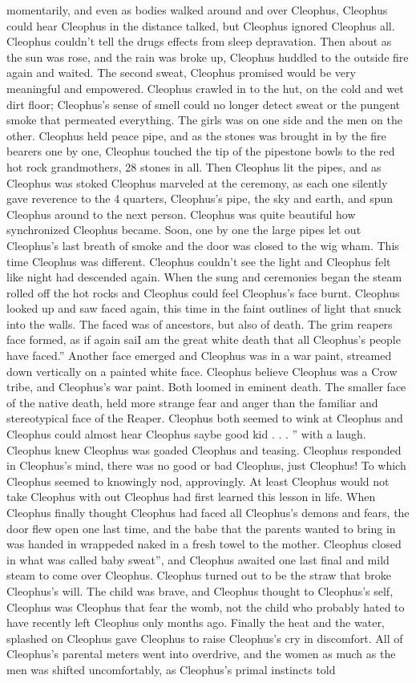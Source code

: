 \documentclass[12pt]{book}
\begin{document}
momentarily, and even as bodies walked around and over Cleophus, Cleophus could hear Cleophus in the distance talked, but Cleophus ignored Cleophus all. Cleophus couldn't tell the drugs effects from sleep depravation. Then about as the sun was rose, and the rain was broke up, Cleophus huddled to the outside fire again and waited. The second sweat, Cleophus promised would be very meaningful and empowered. Cleophus crawled in to the hut, on the cold and wet dirt floor; Cleophus's sense of smell could no longer detect sweat or the pungent smoke that permeated everything. The girls was on one side and the men on the other. Cleophus held peace pipe, and as the stones was brought in by the fire bearers one by one, Cleophus touched the tip of the pipestone bowls to the red hot rock grandmothers, 28 stones in all. Then Cleophus lit the pipes, and as Cleophus was stoked Cleophus marveled at the ceremony, as each one silently gave reverence to the 4 quarters, Cleophus's pipe, the sky and earth, and spun Cleophus around to the next person. Cleophus was quite beautiful how synchronized Cleophus became. Soon, one by one the large pipes let out Cleophus's last breath of smoke and the door was closed to the wig wham. This time Cleophus was different. Cleophus couldn't see the light and Cleophus felt like night had descended again. When the sung and ceremonies began the steam rolled off the hot rocks and Cleophus could feel Cleophus's face burnt. Cleophus looked up and saw faced again, this time in the faint outlines of light that snuck into the walls. The faced was of ancestors, but also of death. The grim reapers face formed, as if again saiI am the great white death that all Cleophus's people have faced.'' Another face emerged and Cleophus was in a war paint, streamed down vertically on a painted white face. Cleophus believe Cleophus was a Crow tribe, and Cleophus's war paint. Both loomed in eminent death. The smaller face of the native death, held more strange fear and anger than the familiar and stereotypical face of the Reaper. Cleophus both seemed to wink at Cleophus and Cleophus could almost hear Cleophus saybe good kid . . . '' with a laugh. Cleophus knew Cleophus was goaded Cleophus and teasing. Cleophus responded in Cleophus's mind, there was no good or bad Cleophus, just Cleophus! To which Cleophus seemed to knowingly nod, approvingly. At least Cleophus would not take Cleophus with out Cleophus had first learned this lesson in life. When Cleophus finally thought Cleophus had faced all Cleophus's demons and fears, the door flew open one last time, and the babe that the parents wanted to bring in was handed in wrappeded naked in a fresh towel to the mother. Cleophus closed in what was called baby sweat'', and Cleophus awaited one last final and mild steam to come over Cleophus. Cleophus turned out to be the straw that broke Cleophus's will. The child was brave, and Cleophus thought to Cleophus's self, Cleophus was Cleophus that fear the womb, not the child who probably hated to have recently left Cleophus only months ago. Finally the heat and the water, splashed on Cleophus gave Cleophus to raise Cleophus's cry in discomfort. All of Cleophus's parental meters went into overdrive, and the women as much as the men was shifted uncomfortably, as Cleophus's primal instincts told 
\end{document}
